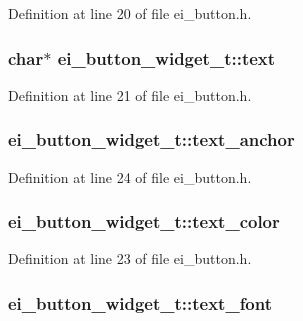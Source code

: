 Definition at line 20 of file ei\_\-button.h.\hypertarget{structei__button__widget__t_a80805109b78e9cf342d2a8c352cfe972}{
\subsubsection[{text}]{\setlength{\rightskip}{0pt plus 5cm}char$\ast$ {\bf ei\_\-button\_\-widget\_\-t::text}}}
\label{structei__button__widget__t_a80805109b78e9cf342d2a8c352cfe972}


Definition at line 21 of file ei\_\-button.h.\hypertarget{structei__button__widget__t_a19d4c3693b903536fc72dc911e36dc9f}{
\subsubsection[{text\_\-anchor}]{ {\bf ei\_\-button\_\-widget\_\-t::text\_\-anchor}}}
\label{structei__button__widget__t_a19d4c3693b903536fc72dc911e36dc9f}


Definition at line 24 of file ei\_\-button.h.\hypertarget{structei__button__widget__t_a52b3ab3bbf1c0705ef749c34225c074f}{
\subsubsection[{text\_\-color}]{ {\bf ei\_\-button\_\-widget\_\-t::text\_\-color}}}
\label{structei__button__widget__t_a52b3ab3bbf1c0705ef749c34225c074f}


Definition at line 23 of file ei\_\-button.h.\hypertarget{structei__button__widget__t_ae5e7655fbfdf95430f00a13bfd0bdad4}{
\subsubsection[{text\_\-font}]{ {\bf ei\_\-button\_\-widget\_\-t::text\_\-font}}}
\label{structei__button__widget__t_ae5e7655fbfdf95430f00a13bfd0bdad4}


